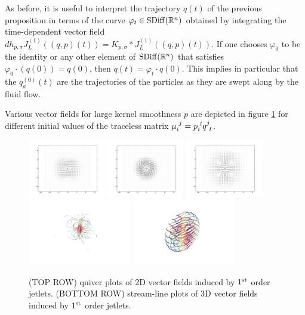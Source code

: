\documentclass[12pt]{amsart}
\begin{document}
  As before, it is useful to interpret the trajectory $q(t)$ of the previous proposition in terms of the curve $\varphi_t \in  {\rm SDiff}(\mathbb{R}^n)$ obtained by integrating the time-dependent vector field $dh_{p, \sigma} J_L^{(1)}((q, p)(t)) = K_{p, \sigma} * J_L^{(1)}((q, p)(t))$. If one chooses $\varphi_0$ to be the identity or  any other element of ${\rm SDiff}(\mathbb{R}^n)$ that satisfies $\varphi_0 \cdot (q(0)) = q(0)$, then  $q(t) = \varphi_t \cdot  q(0)$. This implies in particular that the $q_a^{(0)}(t)$ are the trajectories of the particles as they are swept along by the fluid flow.

  Various vector fields for large kernel smoothness $p$
  are depicted in figure \ref{fig:zoo}
  for different initial values of the traceless matrix
  $\mu\indices{_i^j} = p\indices{_i^l} q\indices{^j_l}$.

  \begin{figure}
  	\centering
        \includegraphics[width=0.3\textwidth]{shear.pdf}
        \includegraphics[width=0.3\textwidth]{spin.pdf}
        \includegraphics[width=0.3\textwidth]{stretch.pdf}
        \\
        \includegraphics[width=0.4\textwidth]{stretch_3D.png}
        \includegraphics[width=0.4\textwidth]{shear_3D.png}
        \caption{(TOP ROW) quiver plots of 2D vector fields induced by $1^{\rm st}$ order jetlets. 
        (BOTTOM ROW) stream-line plots of 3D vector fields induced by $1^{\rm st}$ order jetlets.}
        \label{fig:zoo}
  \end{figure}
\end{document}
